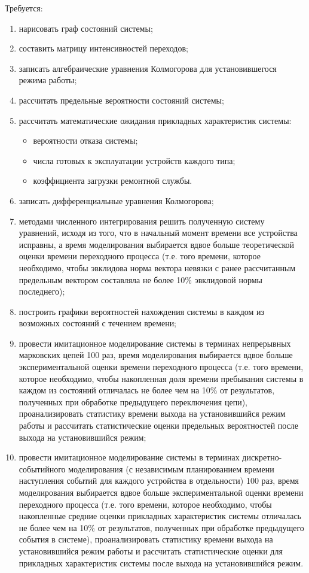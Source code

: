 Требуется:
\begin{enumerate}
    \item нарисовать граф состояний системы;
    \item составить матрицу интенсивностей переходов;
    \item записать алгебраические уравнения Колмогорова для установившегося режима работы;
    \item рассчитать предельные вероятности состояний системы;
    \item рассчитать математические ожидания прикладных характеристик системы:
    \begin{itemize}
        \item вероятности отказа системы;
        \item числа готовых к эксплуатации устройств каждого типа;
        \item коэффициента загрузки ремонтной службы.
    \end{itemize}
    \item записать дифференциальные уравнения Колмогорова;
    \item методами численного интегрирования решить полученную систему уравнений, исходя из того, что в начальный момент времени все устройства исправны, а время моделирования выбирается вдвое больше теоретической оценки времени переходного процесса (т.е. того времени, которое необходимо, чтобы эвклидова норма вектора невязки с ранее рассчитанным предельным вектором составляла не более 10\% эвклидовой нормы последнего);
    \item построить графики вероятностей нахождения системы в каждом из возможных состояний с течением времени;
    \item провести имитационное моделирование системы в терминах непрерывных марковских цепей 100 раз, время моделирования выбирается вдвое больше экспериментальной оценки времени переходного процесса (т.е. того времени, которое необходимо, чтобы накопленная доля времени пребывания системы в каждом из состояний отличалась не более чем на 10\% от результатов, полученных при обработке предыдущего переключения цепи), проанализировать статистику времени выхода на установившийся режим работы и рассчитать статистические оценки предельных вероятностей после выхода на установившийся режим;
    \item провести имитационное моделирование системы в терминах дискретно-событийного моделирования (с независимым планированием времени наступления событий для каждого устройства в отдельности) 100 раз, время моделирования выбирается вдвое больше экспериментальной оценки времени переходного процесса (т.е. того времени, которое необходимо, чтобы накопленные средние оценки прикладных характеристик системы отличалась не более чем на 10\% от результатов, полученных при обработке предыдущего события в системе), проанализировать статистику времени выхода на установившийся режим работы и рассчитать статистические оценки для прикладных характеристик системы после выхода на установившийся режим.
\end{enumerate}
\newpage
